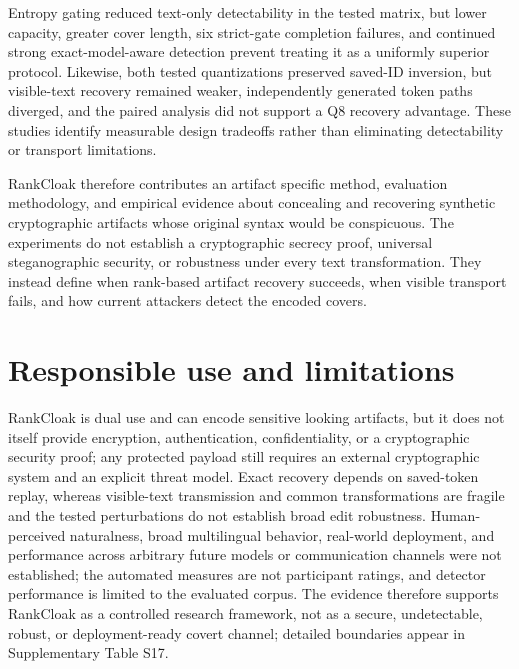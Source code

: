 \documentclass[fleqn,10pt]{wlscirep}
\begin{document}
Entropy gating reduced text-only detectability in the tested matrix, but lower capacity, greater cover length, six strict-gate completion failures, and continued strong exact-model-aware detection prevent treating it as a uniformly superior protocol. Likewise, both tested quantizations preserved saved-ID inversion, but visible-text recovery remained weaker, independently generated token paths diverged, and the paired analysis did not support a Q8 recovery advantage. These studies identify measurable design tradeoffs rather than eliminating detectability or transport limitations.

RankCloak therefore contributes an artifact specific method, evaluation methodology, and empirical evidence about concealing and recovering synthetic cryptographic artifacts whose original syntax would be conspicuous. The experiments do not establish a cryptographic secrecy proof, universal steganographic security, or robustness under every text transformation. They instead define when rank-based artifact recovery succeeds, when visible transport fails, and how current attackers detect the encoded covers.


\section*{Responsible use and limitations}\label{sec:limitations}

RankCloak is dual use and can encode sensitive looking artifacts, but it does not itself provide encryption, authentication,
confidentiality, or a cryptographic security proof; any protected payload still requires an external cryptographic system and
an explicit threat model. Exact recovery depends on saved-token replay, whereas visible-text transmission and common
transformations are fragile and the tested perturbations do not establish broad edit robustness. Human-perceived naturalness,
broad multilingual behavior, real-world deployment, and performance across arbitrary future models or communication channels
were not established; the automated measures are not participant ratings, and detector performance is limited to the evaluated
corpus. The evidence therefore supports RankCloak as a controlled research framework, not as a secure, undetectable, robust,
or deployment-ready covert channel; detailed boundaries appear in Supplementary Table S17.

\end{document}
